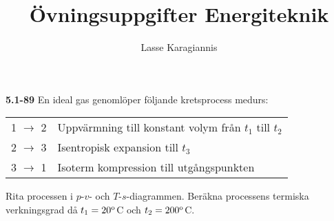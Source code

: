 \documentclass[twocolumn]{book}
\title{Övningsuppgifter Energiteknik}
\author{Lasse Karagiannis}
\begin{document}
\noindent\textbf{5.1-89}\hfill\break
\noindent En ideal gas genomlöper följande kretsprocess medurs:\hfil\par
\noindent\begin{tabular}{ l l  } 
 1 $\rightarrow$ 2 & Uppvärmning till konstant volym från $t_1$ till $t_2$  \\ 
 2 $\rightarrow$ 3 & Isentropisk expansion till $t_3$  \\ 
 3 $\rightarrow$ 1 & Isoterm kompression till utgångspunkten \\ 
\end{tabular}


Rita processen i $p$-$v$- och $T$-$s$-diagrammen. Beräkna processens termiska
verkningsgrad då $t_1=20^{\rm{o}}$C och $t_2=200^{\rm{o}}$C.
\end{document}
